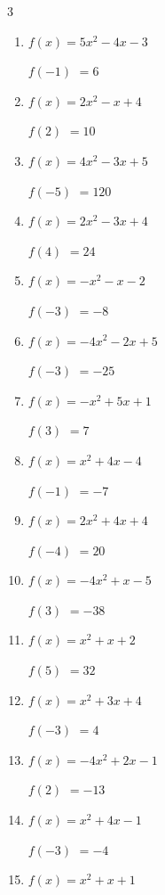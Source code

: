 \begin{multicols}{3}
\begin{enumerate}
$f(4)$
        $= 12$

\columnbreak %

  \item $f(x)=5x^{2}-4x-3$

$f(-1)$
        $= 6$

  \item $f(x)=2x^{2}-x+4$

$f(2)$
        $= 10$

  \item $f(x)=4x^{2}-3x+5$

$f(-5)$
        $= 120$

  \item $f(x)=2x^{2}-3x+4$

$f(4)$
        $= 24$

  \item $f(x)=-x^{2}-x-2$

$f(-3)$
        $= -8$

  \item $f(x)=-4x^{2}-2x+5$

$f(-3)$
        $= -25$

  \item $f(x)=-x^{2}+5x+1$

$f(3)$
        $= 7$

  \item $f(x)=x^{2}+4x-4$

$f(-1)$
        $= -7$

  \item $f(x)=2x^{2}+4x+4$

$f(-4)$
        $= 20$

  \item $f(x)=-4x^{2}+x-5$

$f(3)$
        $= -38$

  \item $f(x)=x^{2}+x+2$

$f(5)$
        $= 32$

  \item $f(x)=x^{2}+3x+4$

$f(-3)$
        $= 4$

  \item $f(x)=-4x^{2}+2x-1$

$f(2)$
        $= -13$

  \item $f(x)=x^{2}+4x-1$

$f(-3)$
        $= -4$

  \item $f(x)=x^{2}+x+1$


\end{enumerate}
\end{multicols}
